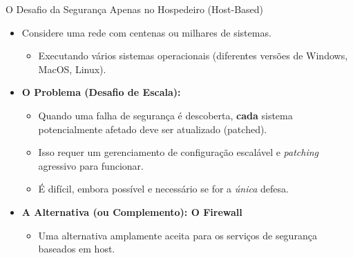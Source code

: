\begin{frame}{O Desafio da Segurança Apenas no Hospedeiro (Host-Based)}
    \begin{itemize}
        \item Considere uma rede com centenas ou milhares de sistemas.
              \begin{itemize}
                  \item Executando vários sistemas operacionais (diferentes versões de Windows, MacOS, Linux).
              \end{itemize}

        \item \textbf{O Problema (Desafio de Escala):}
              \begin{itemize}
                  \item Quando uma falha de segurança é descoberta, \textbf{cada} sistema potencialmente afetado deve ser atualizado (patched).
                  \item Isso requer um gerenciamento de configuração escalável e \textit{patching} agressivo para funcionar.
                  \item É difícil, embora possível e necessário se for a \textit{única} defesa.
              \end{itemize}

        \item \textbf{A Alternativa (ou Complemento): O Firewall}
              \begin{itemize}
                  \item Uma alternativa amplamente aceita para os serviços de segurança baseados em host.
              \end{itemize}
    \end{itemize}
\end{frame}

